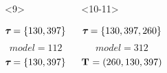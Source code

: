 \begin{frame}[t]
\begin{columns}[c]
        \begin{onlyenv}<9>
            \begin{minipage}[c][0.5\textheight][c]{\linewidth}
                \begin{displaybox}[0.95\linewidth]
                    \begin{minipage}[c][0.45\textheight][c]{0.95\linewidth}
                        \[
                            \boldsymbol{\tau_{}} = \{130,397\}
                        \]\vspace{0mm}
                        \[
                            model = 112
                        \]\vspace{0mm}
                        \[
                            \boldsymbol{\tau_{}} = \{130,397\}
                        \]\vspace{0mm}
                    \end{minipage}
                \end{displaybox}
            \end{minipage}
        \end{onlyenv}
        \begin{onlyenv}<10-11>
            \begin{minipage}[c][0.5\textheight][c]{\linewidth}
                \begin{displaybox}[0.95\linewidth]
                    \begin{minipage}[c][0.45\textheight][c]{0.95\linewidth}
                        \[
                            \boldsymbol{\tau_{}} = \{130,397,260\}
                        \]\vspace{0mm}
                        \[
                            model = 312
                        \]\vspace{0mm}
                        \[
                            \mathbf{T_{}} = (260,130,397)
                        \]\vspace{0mm}
                    \end{minipage}
                \end{displaybox}
            \end{minipage}
        \end{onlyenv}

\end{columns}
\end{frame}
